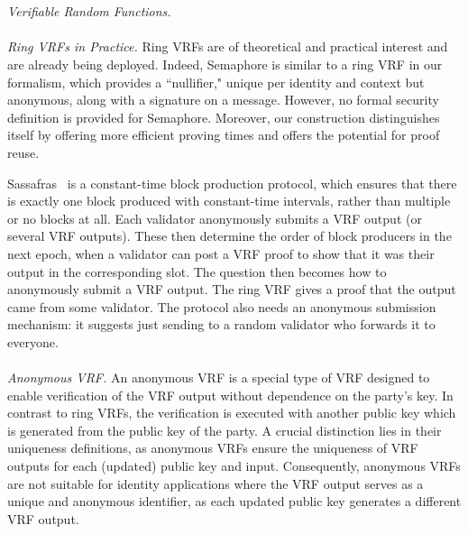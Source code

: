 \\\\
\noindent\textit{Verifiable Random Functions.} 
\\\\
\noindent\textit{Ring VRFs in Practice.} 
Ring VRFs are of theoretical and practical interest and are already being deployed.
Indeed, Semaphore \cite{Semaphore}  is similar to a ring VRF in our formalism, which provides a ``nullifier," unique per identity and context but anonymous, along with a signature on a message. However, no formal security definition is provided for Semaphore.  Moreover, our construction distinguishes itself by offering more efficient proving times  and offers the potential for proof reuse.

Sassafras~\cite{Sassafras} is a constant-time block production protocol, which ensures that there is exactly one block produced with constant-time intervals, rather than multiple or no blocks at all.
Each validator anonymously submits a VRF output (or several VRF outputs). These then determine the order of block producers in the next epoch, when a validator can post a VRF proof to show that it was their output in the corresponding slot. The question then becomes how to anonymously submit a VRF output. The ring VRF gives a proof that the output came from some validator. The protocol also needs an anonymous submission mechanism: it suggests just sending to a random validator who forwards it to everyone.
\\\\
\noindent\textit{Anonymous VRF.}  An anonymous VRF \cite{anonymousVRF} is a special type of VRF designed to enable verification of the VRF output without dependence on the party's key.  In contrast to ring VRFs, the verification is executed with another public key which is generated from the public key of the party.  A crucial distinction lies in their  uniqueness definitions, as anonymous VRFs ensure the uniqueness of VRF outputs for each (updated) public key and input. Consequently, anonymous VRFs are not suitable for identity applications where the VRF output serves as a unique and anonymous identifier, as each updated public key generates a different VRF output.
